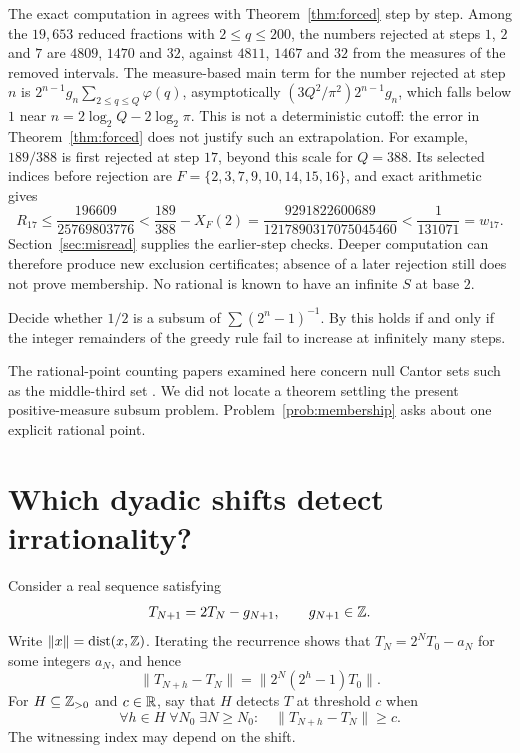 \documentclass[11pt]{article}
\begin{document}
The exact computation in \cite{plectisinvestigation} agrees with
Theorem~\ref{thm:forced} step by step.  Among the $19{,}653$ reduced fractions
with $2\le q\le200$, the numbers rejected at steps $1$, $2$ and $7$ are $4809$,
$1470$ and $32$, against $4811$, $1467$ and $32$ from the measures of the
removed intervals.  The measure-based main term for the number rejected at step $n$ is
$2^{n-1}g_n\sum_{2\le q\le Q}\varphi(q)$, asymptotically $(3Q^2/\pi^2)2^{n-1}g_n$,
which falls below $1$ near $n=2\log_2Q-2\log_2\pi$.  This is not a
deterministic cutoff: the error in Theorem~\ref{thm:forced} does not justify
such an extrapolation.  For example, $189/388$ is first rejected at step $17$,
beyond this scale for $Q=388$.  Its selected indices before rejection are
$F=\{2,3,7,9,10,14,15,16\}$, and exact arithmetic gives
\[
 R_{17}\le\frac{196609}{25769803776}
 <\frac{189}{388}-X_F(2)
 =\frac{9291822600689}{1217890317075045460}
 <\frac1{131071}=w_{17}.
\]
Section~\ref{sec:misread} supplies the earlier-step checks.  Deeper computation can
therefore produce new exclusion certificates; absence of a later rejection
still does not prove membership.  No rational is known to have an infinite
$S$ at base $2$.

\begin{problem}\label{prob:membership}
Decide whether $1/2$ is a subsum of $\sum(2^n-1)^{-1}$.  By
\cite[Theorem~7]{plectis257} this holds if and only if the integer remainders
of the greedy rule fail to increase at infinitely many steps.
\end{problem}

The rational-point counting papers examined here concern null Cantor sets
such as the middle-third set \cite{rstw2019,chowvarjuyu2024}.  We did not locate
a theorem settling the present positive-measure subsum problem.
Problem~\ref{prob:membership} asks about one explicit rational point.


\section{Which dyadic shifts detect irrationality?}\label{sec:dyadic-shifts}

Consider a real sequence satisfying
\[
 T_{N+1}=2T_N-g_{N+1},\qquad g_{N+1}\in\mathbb{Z}.
\]
Write $\|x\|=\operatorname{dist}(x,\mathbb{Z})$. Iterating the recurrence shows that
$T_N=2^NT_0-a_N$ for some integers $a_N$, and hence
\begin{equation}\label{eq:dyadic-shift-identity}
 \|T_{N+h}-T_N\|=\|2^N(2^h-1)T_0\|.
\end{equation}
For $H\subseteq\mathbb{Z}_{>0}$ and $c\in\mathbb{R}$, say that $H$ detects $T$ at threshold
$c$ when
\begin{equation}\label{eq:dyadic-restricted-predicate}
 \forall h\in H\;\forall N_0\;\exists N\ge N_0:\quad
 \|T_{N+h}-T_N\|\ge c.
\end{equation}
The witnessing index may depend on the shift.
\end{document}
